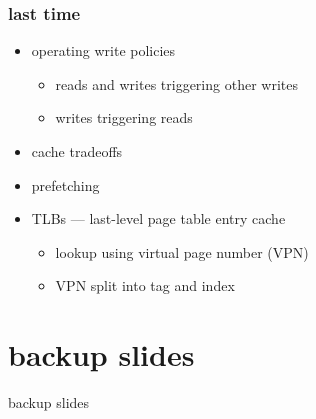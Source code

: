 \date{}
\title{}
\date{}

\begin{frame}
    \titlepage
\end{frame}





\begin{frame}
\frametitle{last time}
    \begin{itemize}
    \item operating write policies
        \begin{itemize}
        \item reads and writes triggering other writes
        \item writes triggering reads
        \end{itemize}
    \item cache tradeoffs
    \item prefetching
    \item TLBs --- last-level page table entry cache
        \begin{itemize}
        \item lookup using virtual page number (VPN)
        \item VPN split into tag and index
        \end{itemize}
    \end{itemize}
\end{frame}

\section{backup slides}
\begin{frame}{backup slides}
\end{frame}


